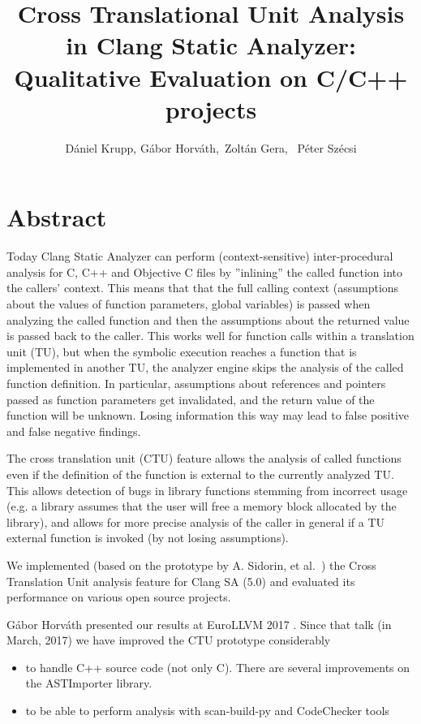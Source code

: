 \documentclass{article}
\title{Cross Translational Unit Analysis in Clang Static Analyzer: Qualitative Evaluation on C/C++ projects}
\author{D\'aniel Krupp\inst1, G\'abor Horv\'ath\inst2,\ Zolt\'an Gera\inst2, \ P\' eter Sz\' ecsi\inst2}
\institute{\inst1Ericsson Ltd., \inst2E\"{o}tv\"{o}s Lor\'{a}nd University, Faculty of Informatics\\
             \inst1\url{daniel.krupp@ericsson.com},                           
             \inst2\url{xazax@caesar.elte.hu}, 
             \inst2\url{gerazo@caesar.elte.hu},
             \inst2\url{szepet95@gmail.com}}
\begin{document}
\maketitle


\section{Abstract}
Today Clang Static Analyzer \cite{clangsa} can perform (context-sensitive) inter-procedural analysis for 
C, C++ and Objective C files by ''inlining'' 
the called function into the callers' context. This means that that the full 
calling context
(assumptions about the values of function parameters, global variables) is passed when 
analyzing the called function and
then the assumptions about the returned value is passed back to the caller. 
This works well for function calls within a
translation unit (TU), but when the symbolic execution reaches a function that 
is implemented in another TU, the analyzer engine 
skips the analysis of the called function definition. In particular,
assumptions about references and pointers passed as function 
parameters get invalidated, and the return value of the function will be unknown.
Losing information this way may lead to false positive
and false negative findings.

The cross translation unit (CTU) feature allows the analysis of called 
functions even if the definition of the function is external to the currently 
analyzed TU. This allows detection of bugs in library functions stemming
from incorrect usage (e.g. a library assumes that the user will free a memory 
block allocated by the library), and allows for more precise analysis
of the caller in general if a TU external function is invoked
(by not losing assumptions).

We implemented (based on the prototype by A. Sidorin, et al.~\cite{artemctu})
the Cross Translation Unit analysis feature for Clang SA (5.0) and evaluated 
its performance on various open source projects. 

G\'abor Horv\'ath presented our results at EuroLLVM 2017 \cite{eurollvm17}.
Since that talk (in March, 2017) we have improved the CTU prototype considerably 
\begin{itemize}
\item to handle C++ source code (not only C). There are several improvements on 
the ASTImporter library.
\item to be able to perform analysis with scan-build-py and CodeChecker tools
\end{itemize}
\end{document}
